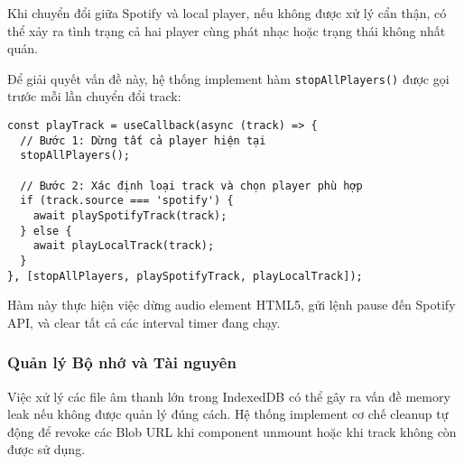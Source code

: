 \documentclass[12pt,a4paper]{article}
\begin{document}
\begin{center}
\end{center}

Khi chuyển đổi giữa Spotify và local player, nếu không được xử lý cẩn thận, có thể xảy ra tình trạng cả hai player cùng phát nhạc hoặc trạng thái không nhất quán.

Để giải quyết vấn đề này, hệ thống implement hàm \texttt{stopAllPlayers()} được gọi trước mỗi lần chuyển đổi track:

\begin{lstlisting}[caption={Cơ chế ngăn chặn xung đột player}]
const playTrack = useCallback(async (track) => {
  // Bước 1: Dừng tất cả player hiện tại
  stopAllPlayers();
  
  // Bước 2: Xác định loại track và chọn player phù hợp
  if (track.source === 'spotify') {
    await playSpotifyTrack(track);
  } else {
    await playLocalTrack(track);
  }
}, [stopAllPlayers, playSpotifyTrack, playLocalTrack]);
\end{lstlisting}

Hàm này thực hiện việc dừng audio element HTML5, gửi lệnh pause đến Spotify API, và clear tất cả các interval timer đang chạy.

\subsubsection{Quản lý Bộ nhớ và Tài nguyên}

Việc xử lý các file âm thanh lớn trong IndexedDB có thể gây ra vấn đề memory leak nếu không được quản lý đúng cách. Hệ thống implement cơ chế cleanup tự động để revoke các Blob URL khi component unmount hoặc khi track không còn được sử dụng.
\end{document}
